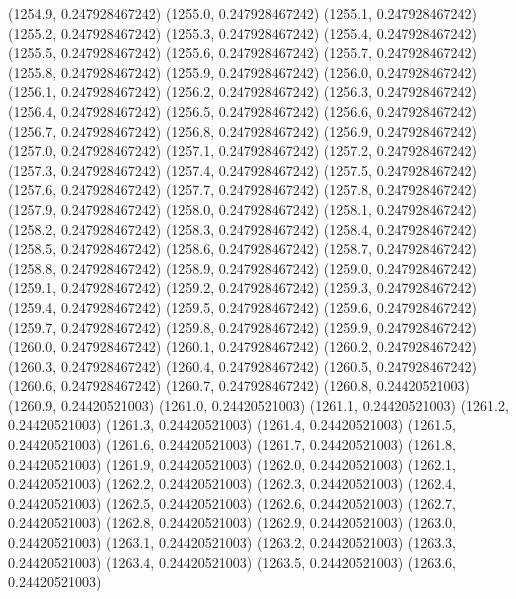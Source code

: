 {					(1254.9, 0.247928467242)
					(1255.0, 0.247928467242)
					(1255.1, 0.247928467242)
					(1255.2, 0.247928467242)
					(1255.3, 0.247928467242)
					(1255.4, 0.247928467242)
					(1255.5, 0.247928467242)
					(1255.6, 0.247928467242)
					(1255.7, 0.247928467242)
					(1255.8, 0.247928467242)
					(1255.9, 0.247928467242)
					(1256.0, 0.247928467242)
					(1256.1, 0.247928467242)
					(1256.2, 0.247928467242)
					(1256.3, 0.247928467242)
					(1256.4, 0.247928467242)
					(1256.5, 0.247928467242)
					(1256.6, 0.247928467242)
					(1256.7, 0.247928467242)
					(1256.8, 0.247928467242)
					(1256.9, 0.247928467242)
					(1257.0, 0.247928467242)
					(1257.1, 0.247928467242)
					(1257.2, 0.247928467242)
					(1257.3, 0.247928467242)
					(1257.4, 0.247928467242)
					(1257.5, 0.247928467242)
					(1257.6, 0.247928467242)
					(1257.7, 0.247928467242)
					(1257.8, 0.247928467242)
					(1257.9, 0.247928467242)
					(1258.0, 0.247928467242)
					(1258.1, 0.247928467242)
					(1258.2, 0.247928467242)
					(1258.3, 0.247928467242)
					(1258.4, 0.247928467242)
					(1258.5, 0.247928467242)
					(1258.6, 0.247928467242)
					(1258.7, 0.247928467242)
					(1258.8, 0.247928467242)
					(1258.9, 0.247928467242)
					(1259.0, 0.247928467242)
					(1259.1, 0.247928467242)
					(1259.2, 0.247928467242)
					(1259.3, 0.247928467242)
					(1259.4, 0.247928467242)
					(1259.5, 0.247928467242)
					(1259.6, 0.247928467242)
					(1259.7, 0.247928467242)
					(1259.8, 0.247928467242)
					(1259.9, 0.247928467242)
					(1260.0, 0.247928467242)
					(1260.1, 0.247928467242)
					(1260.2, 0.247928467242)
					(1260.3, 0.247928467242)
					(1260.4, 0.247928467242)
					(1260.5, 0.247928467242)
					(1260.6, 0.247928467242)
					(1260.7, 0.247928467242)
					(1260.8, 0.24420521003)
					(1260.9, 0.24420521003)
					(1261.0, 0.24420521003)
					(1261.1, 0.24420521003)
					(1261.2, 0.24420521003)
					(1261.3, 0.24420521003)
					(1261.4, 0.24420521003)
					(1261.5, 0.24420521003)
					(1261.6, 0.24420521003)
					(1261.7, 0.24420521003)
					(1261.8, 0.24420521003)
					(1261.9, 0.24420521003)
					(1262.0, 0.24420521003)
					(1262.1, 0.24420521003)
					(1262.2, 0.24420521003)
					(1262.3, 0.24420521003)
					(1262.4, 0.24420521003)
					(1262.5, 0.24420521003)
					(1262.6, 0.24420521003)
					(1262.7, 0.24420521003)
					(1262.8, 0.24420521003)
					(1262.9, 0.24420521003)
					(1263.0, 0.24420521003)
					(1263.1, 0.24420521003)
					(1263.2, 0.24420521003)
					(1263.3, 0.24420521003)
					(1263.4, 0.24420521003)
					(1263.5, 0.24420521003)
					(1263.6, 0.24420521003)
}
